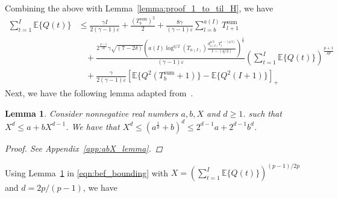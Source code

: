 \documentclass[12pt,draftcls, onecolumn]{IEEEtran}
\newtheorem{lemma}{Lemma}
\begin{document}
Combining the above with Lemma~\ref{lemma:proof_1_to_til_H}, we have
\begin{align}\label{eqn:bef_bounding}
\sum_{t=1}^{I}\mathbb{E}\{Q(t)\} &\leq \frac{\gamma I}{2(\gamma-1)\varepsilon}+ \frac{(T_b^{\text{sum}})^2}{2}+ \frac{8\gamma}{(\gamma-1)\varepsilon}\sum_{l=b}^{a( I)}T^{\text{sum}}_{l+1} \nonumber\\&\ \ \ \ +\frac{2^{\frac{p-1}{2p}}\gamma\sqrt{(7-2\delta)}\left(a( I) \log^{q/2}(T_{a( I)})\frac{d_{a( I)}^{q/2}T_l^{1-(q/2)}}{1-(q/2)}\right)^{\frac{1}{q}}}{(\gamma-1)\varepsilon}  \left(\sum_{t=1}^{ I}\mathbb{E}\{Q(t)\}\right)^{\frac{p+1}{2p}} \nonumber\\&\ \ \ \  + \frac{\gamma}{2(\gamma-1)\varepsilon}\left[\mathbb{E}\{Q^2(T^{\text{sum}}_b+1)\}-\mathbb{E}\{Q^2( I+1)\}\right]_+
\end{align}
Next, we have the following lemma adapted from~\cite{Huang2024}.
\begin{lemma}\label{lemma:abX_lemma}
Consider nonnegative real numbers $a,b,X$ and $d \geq 1$. such that $X^d \leq a+ bX^{d-1}$. We have that $X^d \leq \left(a^{\frac{1}{d}} + b\right)^{d} \leq 2^{d-1}a+ 2^{d-1}b^d$.
\begin{proof}
    See Appendix~\ref{app:abX_lemma}.
\end{proof}
\end{lemma}
Using Lemma~\ref{lemma:abX_lemma} in \eqref{eqn:bef_bounding} with $X = \left(\sum_{t=1}^{I} \mathbb{E}\{Q(t)\}\right)^{(p-1)/2p}$ and $d=2p/(p-1)$, we have
\end{document}
